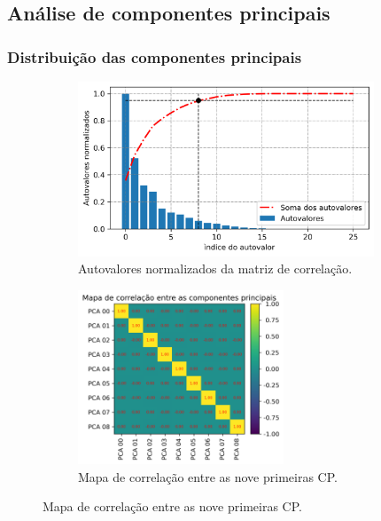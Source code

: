 \documentclass[121pt, aspectratio=169, t]{beamer}
\begin{document}
\subsection{Análise de componentes principais}
\begin{frame}[fragile=singleslide]
	\frametitle{Distribuição das componentes principais}
		\begin{figure}
		\centering
		\begin{subfigure}[t]{8.2cm}
			\includegraphics[height=5.2cm]{EiVals_features.png}
			\caption{Autovalores normalizados da matriz de correlação.}
		\end{subfigure}
		\hfill
		\begin{subfigure}[t]{5.9cm}
			\centering
			\includegraphics[height=5.2cm]{Correelacao_pca.png}
			\caption{Mapa de correlação entre as nove primeiras CP.}
		\end{subfigure}
	\end{figure}
\end{frame}
\end{document}
